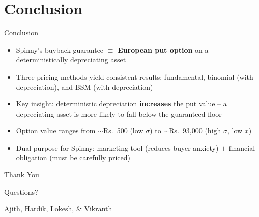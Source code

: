 \documentclass[11pt, aspectratio=43]{beamer}
\begin{document}
\section{Conclusion}

\begin{frame}{Conclusion}
    \begin{itemize}
        \item Spinny's buyback guarantee $\equiv$ \textbf{European put option} on a deterministically depreciating asset

        \vspace{0.5em}
        \item Three pricing methods yield consistent results: fundamental, binomial (with depreciation), and BSM (with depreciation)

        \vspace{0.5em}
        \item Key insight: deterministic depreciation \textbf{increases} the put value -- a depreciating asset is more likely to fall below the guaranteed floor

        \vspace{0.5em}
        \item Option value ranges from $\sim$Rs.~500 (low $\sigma$) to $\sim$Rs.~93,000 (high $\sigma$, low $x$)

        \vspace{0.5em}
        \item Dual purpose for Spinny: marketing tool (reduces buyer anxiety) $+$ financial obligation (must be carefully priced)
    \end{itemize}
\end{frame}


\begin{frame}{}
    \centering
    \vspace{2em}
    {\Huge Thank You}

    \vspace{1.5em}
    {\large Questions?}

    \vspace{2em}
    {\small Ajith, Hardik, Lokesh, \& Vikranth}
\end{frame}
\end{document}
